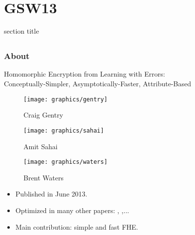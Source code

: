 \documentclass[lualatex, 9pt,serif]{beamer}
\newenvironment{cframe}[1]{
\begin{frame}
\frametitle{#1} } 
{
\end{frame}
}
\begin{document}

\section{GSW13}

\begin{frame}

\centering
\begin{beamercolorbox}[sep=8pt,center]{section title}
	\insertsection\par
\end{beamercolorbox}

\end{frame}
\subsection[About]{}
\begin{cframe}{About}
	
	\begin{center}
		Homomorphic Encryption from Learning with Errors: \\
		Conceptually-Simpler, Asymptotically-Faster, Attribute-Based
	\end{center}
	
	\begin{figure}[!htb]
		\begin{minipage}{0.3\textwidth}
			\centering
			\texttt{[image: graphics/gentry]} 
			\caption*{Craig Gentry}
		\end{minipage}\hfill
		\begin{minipage}{0.3\textwidth}
			\centering
			\texttt{[image: graphics/sahai]}
			\caption*{Amit Sahai}
		\end{minipage}\hfill
		\begin{minipage}{0.3\textwidth}
			\centering
			\texttt{[image: graphics/waters]}
			\caption*{Brent Waters}
		\end{minipage}
	\end{figure}
	
	\begin{itemize}
		\item<2-> Published in June 2013.
		\item<3-> Optimized in many other papers: \cite{ducas2015fhew}, \cite{chillotti2016faster},...
		\item<4-> Main contribution: simple and fast FHE.
	\end{itemize}
	
\end{cframe}
\end{document}
